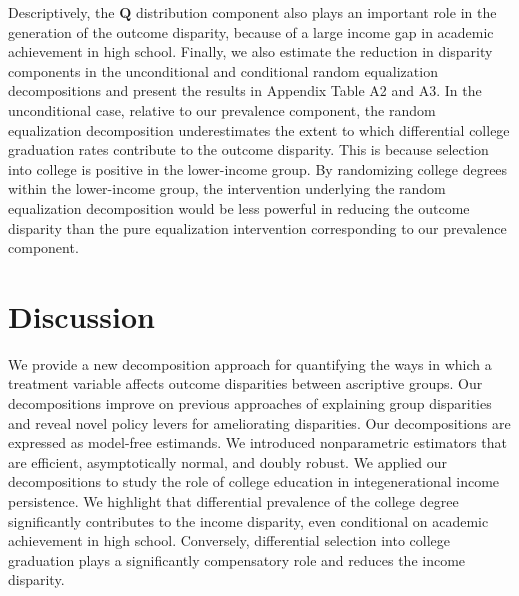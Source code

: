 \documentclass[12pt,a4paper]{article}
\def\Q{{\boldsymbol Q}}
\begin{document}
Descriptively, the $\Q$ distribution component also plays an important role in the generation of the outcome disparity, because of a large income gap in academic achievement in high school. Finally, we also estimate the reduction in disparity components in the unconditional and conditional random equalization decompositions \citep{jackson_decomposition_2018, jackson_meaningful_2021} and present the results in Appendix Table A2 and A3. In the unconditional case, relative to our prevalence component, the random equalization decomposition underestimates the extent to which differential college graduation rates contribute to the outcome disparity. This is because selection into college is positive in the lower-income group. By randomizing college degrees within the lower-income group, the intervention underlying the random equalization decomposition would be less powerful in reducing the outcome disparity than the pure equalization intervention corresponding to our prevalence component. 

\section{Discussion}
We provide a new decomposition approach for quantifying the ways in which a treatment variable affects outcome disparities between ascriptive groups. Our decompositions improve on previous approaches of explaining group disparities and reveal novel policy levers for ameliorating disparities. Our decompositions are expressed as model-free estimands. We introduced nonparametric estimators that are efficient, asymptotically normal, and doubly robust. We applied our decompositions to study the role of college education in integenerational income persistence. We highlight that differential prevalence of the college degree significantly contributes to the income disparity, even conditional on academic achievement in high school. Conversely, differential selection into college graduation plays a significantly compensatory role and reduces the income disparity.
\end{document}

